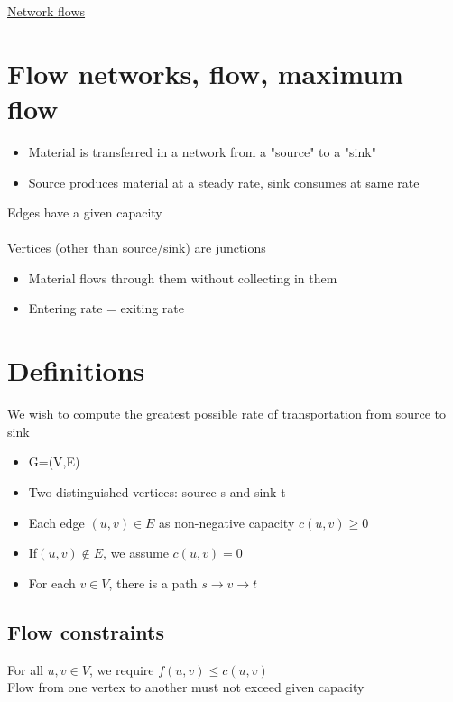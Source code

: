 \documentclass{article}[18pt]
\begin{document}
\begin{center}
\underline{\huge Network flows}
\end{center}
\section{Flow networks, flow, maximum flow}
\begin{itemize}
	\item Material is transferred in a network from a "source" to a "sink"
	\item Source produces material at a steady rate, sink consumes at same rate
\end{itemize}
Edges have a given capacity\\
\\
Vertices (other than source/sink) are junctions
\begin{itemize}
	\item Material flows through them without collecting in them
	\item Entering rate = exiting rate
\end{itemize}
\section{Definitions}
\begin{defin}
	We wish to compute the greatest possible rate of transportation from source to sink
\end{defin}

\begin{defin}
\begin{itemize}
	\item G=(V,E)
	\item Two distinguished vertices: source s and sink t
	\item Each edge $(u,v)\in E$ as non-negative capacity $c(u,v)\geqslant 0$
	\item If$(u,v)\notin E$, we assume $c(u,v)=0$
	\item For each $v\in V$, there is a path $s\rightarrow v \rightarrow t$
\end{itemize}
\end{defin}
\subsection{Flow constraints}
\begin{defin}
	For all $u,v\in V$, we require $f(u,v)\leqslant c(u,v)$\\
	Flow from one vertex to another must not exceed given capacity
\end{defin}
\end{document}
